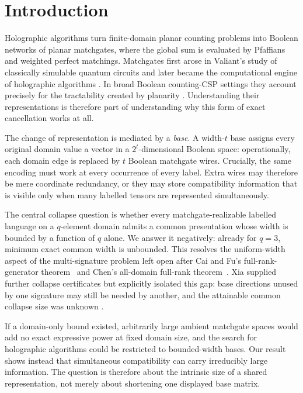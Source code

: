 \documentclass[11pt]{article}
\theoremstyle{definition}
\theoremstyle{remark}
\begin{document}
\section{Introduction}
\label{sec:introduction}

Holographic algorithms turn finite-domain planar counting problems into
Boolean networks of planar matchgates, where the global sum is evaluated by
Pfaffians and weighted perfect matchings.  Matchgates first arose in
Valiant's study of classically simulable quantum circuits and later became
the computational engine of holographic algorithms
\cite{Valiant2002,Valiant2006,Valiant2008}.  In broad Boolean counting-CSP
settings they account precisely for the tractability created by planarity
\cite{CaiLuXia2017}.  Understanding their representations is therefore part
of understanding why this form of exact cancellation works at all.

The change of representation is mediated by a \emph{base}.  A width-$t$
base assigns every original domain value a vector in a $2^t$-dimensional
Boolean space: operationally, each domain edge is replaced by $t$ Boolean
matchgate wires.  Crucially, the same encoding must work at every occurrence
of every label.  Extra wires may therefore be mere coordinate redundancy,
or they may store compatibility information that is visible only when many
labelled tensors are represented simultaneously.

The central collapse question is whether every matchgate-realizable labelled
language on a $q$-element domain admits a common presentation whose width is
bounded by a function of $q$ alone.  We answer it negatively: already for
$q=3$, minimum exact common width is unbounded.  This resolves the
uniform-width aspect of the multi-signature problem left open after Cai and
Fu's full-rank-generator theorem~\cite{CaiFu2014} and Chen's all-domain
full-rank theorem~\cite{Chen2016}.  Xia supplied
further collapse certificates but explicitly isolated this gap: base
directions unused by one signature may still be needed by another, and the
attainable common collapse size was unknown
\cite[end of Section~5]{Xia2016}.

If a domain-only bound existed, arbitrarily large ambient matchgate spaces
would add no exact expressive power at fixed domain size, and the search for
holographic algorithms could be restricted to bounded-width bases.  Our
result shows instead that simultaneous compatibility can carry irreducibly
large information.  The question is therefore about the intrinsic size of a
shared representation, not merely about shortening one displayed base
matrix.
\end{document}
